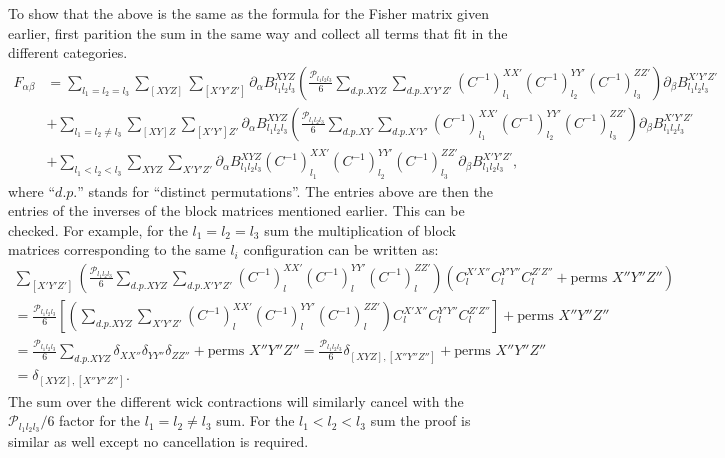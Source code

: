 \documentclass[11pt]{article} %
\newcommand{\br}[1]{\ensuremath{\left( #1 \right)}}
\newcommand{\sbr}[1]{\ensuremath{\left[ #1 \right]}}
\begin{document}
To show that the above is the same as the formula for the Fisher matrix given earlier, first parition the sum in the same way and collect all terms that fit in the different categories.
\begin{align*}
    F_{\alpha\beta} &= \sum_{l_1=l_2=l_3} \sum_{[XYZ]}\sum_{[X'Y'Z']} \partial_{\alpha} B^{XYZ}_{l_1 l_2 l_3}\br{\frac{\mathcal P _{l_1l_2l_3}}{6}\sum_{d. p. XYZ} \sum_{d. p. X'Y'Z'}(C^{-1})^{X X'}_{l_1}
    (C^{-1})^{Y Y'}_{l_2}
    (C^{-1})^{Z Z'}_{l_3}}
    \partial_\beta B^{X' Y' Z'}_{l_1 l_2 l_3} \\
    &+ \sum_{l_1=l_2\neq l_3} \sum_{[XY]Z}\sum_{[X'Y']Z'} \partial_{\alpha} B^{XYZ}_{l_1 l_2 l_3}\br{\frac{\mathcal P _{l_1l_2l_3}}{6}\sum_{d. p. XY} \sum_{d. p. X'Y'}(C^{-1})^{X X'}_{l_1}
    (C^{-1})^{Y Y'}_{l_2}
    (C^{-1})^{Z Z'}_{l_3}}
    \partial_\beta B^{X' Y' Z'}_{l_1 l_2 l_3} \\
    &+ \sum_{l_1<l_2<l_3} \sum_{XYZ}\sum_{X'Y'Z'} \partial_{\alpha} B^{XYZ}_{l_1 l_2 l_3}(C^{-1})^{X X'}_{l_1}
    (C^{-1})^{Y Y'}_{l_2}
    (C^{-1})^{Z Z'}_{l_3}
    \partial_\beta B^{X' Y' Z'}_{l_1 l_2 l_3},
\end{align*}
where ``$d. p.$'' stands for ``distinct permutations''.
The entries above are then the entries of the inverses of the block matrices mentioned earlier. This can be checked. For example, for the $l_1 = l_2 = l_3$ sum the multiplication of block matrices corresponding to the same $l_i$ configuration can be written as:
\begin{gather*}
    \sum_{[X'Y'Z']} \br{\frac{\mathcal P _{l_1l_2l_3}}{6} \sum_{d. p. XYZ} \sum_{d. p. X'Y'Z'}(C^{-1})^{X X'}_{l}
    (C^{-1})^{Y Y'}_{l}
    (C^{-1})^{Z Z'}_{l}} \br{C^{X'X''}_l C^{Y'Y''}_l C^{Z'Z''}_l + \text{perms } X''Y''Z''} \\
    = \frac{\mathcal P _{l_1l_2l_3}}{6}\sbr{\br{\sum_{d. p. XYZ} \sum_{X'Y'Z'}(C^{-1})^{X X'}_{l}
    (C^{-1})^{Y Y'}_{l}
    (C^{-1})^{Z Z'}_{l}} C^{X'X''}_l C^{Y'Y''}_l C^{Z'Z''}_l} + \text{perms } X''Y''Z'' \\
    = \frac{\mathcal P _{l_1l_2l_3}}{6} \sum_{d. p. XYZ} \delta_{XX''}\delta_{YY''}\delta_{ZZ''} + \text{perms } X''Y''Z''
    = \frac{\mathcal P _{l_1l_2l_3}}{6} \delta_{[XYZ], [X''Y''Z'']} + \text{perms } X''Y''Z''\\
    = \delta_{[XYZ], [X''Y''Z'']} .
\end{gather*}
The sum over the different wick contractions will similarly cancel with the $\mathcal P_{l_1l_2l_3} / 6$ factor for the $l_1 = l_2 \neq l_3$ sum. For the $l_1 < l_2 < l_3$ sum the proof is similar as well except no cancellation is required.
\end{document}
